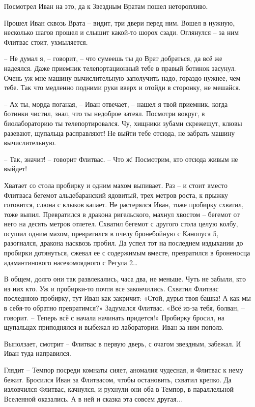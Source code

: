 \documentclass[ebook,oneside,final,openright]{memoir}
\begin{document}
\par
Посмотрел Иван на это, да к Звездным Вратам пошел неторопливо.\par
\par
\par
Прошел Иван сквозь Врата – видит, три двери перед ним. Вошел в нужную, несколько шагов прошел и слышит какой-то шорох сзади. Оглянулся – за ним Флитвас стоит, ухмыляется. \par
\par
– Не думал я, – говорит, – что сумеешь ты до Врат добраться, да всё же надеялся. Даже приемник телепортационный тебе в правый ботинок засунул. Очень уж мне машину вычислительную заполучить надо, гораздо нужнее, чем тебе. Так что медленно подними руки вверх и отойди в сторонку, не мешайся.\par
– Ах ты, морда поганая, – Иван отвечает, – нашел я твой приемник, когда ботинки чистил, знал, что ты недоброе затеял. Посмотри вокруг, в биолабораторию ты телепортировался. Чу, хищники зубами скрежещут, клювы разевают, щупальца расправляют! Не выйти тебе отсюда, не забрать машину вычислительную.\par
– Так, значит! – говорит Флитвас. – Что ж! Посмотрим, кто отсюда живым не выйдет!\par
\par
Хватает со стола пробирку и одним махом выпивает. Раз – и стоит вместо Флитваса бегемот альдебаранский ядовитый, трех метров роста, к прыжку готовится, слюна с клыков капает. Не растерялся Иван, тоже пробирку схватил, тоже выпил. Превратился в дракона ригельского, махнул хвостом – бегемот от него на десять метров отлетел. Схватил бегемот с другого стола целую колбу, осушил одним махом, превратился в пчелу бронебойную с Канопуса 5, разогнался, дракона насквозь пробил. Да успел тот на последнем издыхании до пробирки дотянуться, сжевал ее с содержимым вместе, превратился в броненосца адамантинового насекомоядного с Регула 2…\par
\par
В общем, долго они так развлекались, часа два, не меньше. Чуть не забыли, кто из них кто. Уж и пробирки-то почти все закончились. Схватил Флитвас последнюю пробирку, тут Иван как закричит: «Стой, дурья твоя башка! А как мы в себя-то обратно превратимся?» Задумался Флитвас. «Всё из-за тебя, болван, – говорит. – Теперь всё с начала начинать придется!» Пробирку бросил, на щупальцах приподнялся и выбежал из лаборатории. Иван за ним пополз.\par
\par
Выползает, смотрит – Флитвас в первую дверь, с очагом звездным, забежал. И Иван туда направился.\par
\par
Глядит – Темпор посреди комнаты сияет, аномалия чудесная, и Флитвас к нему бежит. Бросился Иван за Флитвасом, чтобы остановить, схватил крепко. Да изловчился Флитвас, качнулся, и рухнули они оба в Темпор, в параллельной Вселенной оказались. А в ней и сказка эта совсем другая...\par
\end{document}
